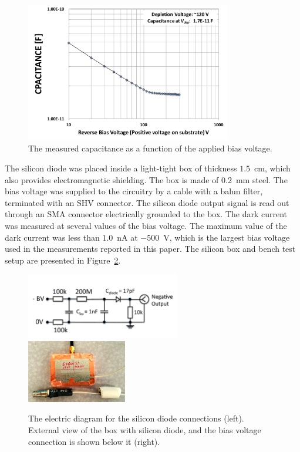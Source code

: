 \documentclass[preprint,1p]{elsarticle}
\begin{document}
\begin{figure}[htbp] 
\centering
\includegraphics[width=0.8\textwidth]{plots/SiliconDiodeCV_v3.pdf} 
\caption{The measured capacitance as a function of the applied bias voltage.} 
\label{fig:SiliconDiode} 
\end{figure} 

The silicon diode was placed inside a light-tight box of thickness $1.5$~cm,
which also provides electromagnetic shielding. The box is made of 0.2~mm steel.
The bias voltage was supplied to the circuitry by a cable with a balun filter,
terminated with an SHV connector. The silicon diode output signal is read out
through an SMA connector electrically grounded to the box. The dark current was
measured at several values of the bias voltage. The maximum value of the dark
current was less than $1.0$~nA at $-500$~V, which is the largest bias voltage
used in the measurements reported in this paper. The silicon box and bench test
setup are presented in Figure~\ref{fig:SiliconPad}. 

\begin{figure}[htbp] 
\centering
\includegraphics[width=0.60\textwidth]{plots/SiliconDiodeDiagram.pdf} 
\includegraphics[width=0.39\textwidth]{plots/SiliconDiodeBox.jpg} 
\caption{The electric diagram for the silicon diode connections (left). External
view of the box with silicon diode, and the bias voltage connection is shown
below it (right).} 
\label{fig:SiliconPad} 
\end{figure} 
\end{document}
